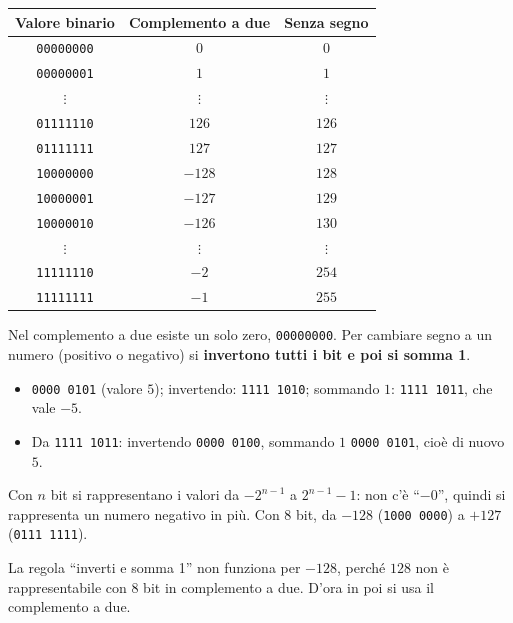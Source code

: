 \documentclass[11pt,a4paper]{article}
\begin{document}
\begin{center}
\begin{tabular}{ccc}
\toprule
\textbf{Valore binario} & \textbf{Complemento a due} & \textbf{Senza segno} \\
\midrule
\texttt{00000000} & $0$    & $0$   \\
\texttt{00000001} & $1$    & $1$   \\
$\vdots$ & $\vdots$ & $\vdots$ \\
\texttt{01111110} & $126$  & $126$ \\
\texttt{01111111} & $127$  & $127$ \\
\texttt{10000000} & $-128$ & $128$ \\
\texttt{10000001} & $-127$ & $129$ \\
\texttt{10000010} & $-126$ & $130$ \\
$\vdots$ & $\vdots$ & $\vdots$ \\
\texttt{11111110} & $-2$   & $254$ \\
\texttt{11111111} & $-1$   & $255$ \\
\bottomrule
\end{tabular}
\end{center}

Nel complemento a due esiste un solo zero, \texttt{00000000}. Per cambiare segno a
un numero (positivo o negativo) si \textbf{invertono tutti i bit e poi si somma 1}.

\begin{esempio}
\begin{itemize}
    \item \texttt{0000 0101} (valore $5$); invertendo: \texttt{1111 1010};
          sommando $1$: \texttt{1111 1011}, che vale $-5$.
    \item Da \texttt{1111 1011}: invertendo \texttt{0000 0100}, sommando $1$
          \texttt{0000 0101}, cioè di nuovo $5$.
\end{itemize}
\end{esempio}

Con $n$ bit si rappresentano i valori da $-2^{n-1}$ a $2^{n-1} - 1$: non c'è
``$-0$'', quindi si rappresenta un numero negativo in più. Con 8 bit, da $-128$
(\texttt{1000 0000}) a $+127$ (\texttt{0111 1111}).

\begin{osservazione}
La regola ``inverti e somma 1'' non funziona per $-128$, perché $128$ non è
rappresentabile con 8 bit in complemento a due. D'ora in poi si usa il complemento
a due.
\end{osservazione}
\end{document}
